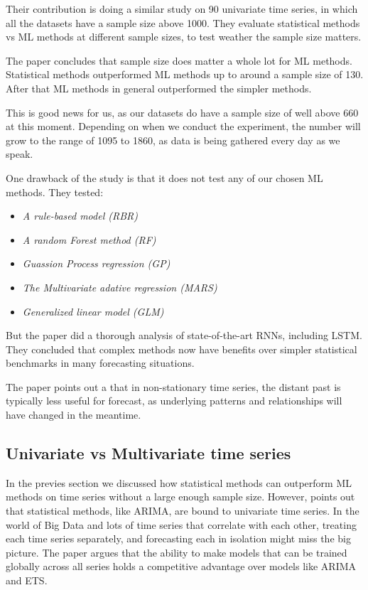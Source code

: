 Their contribution is doing a similar study on 90 univariate time series, in which 
all the datasets have a sample size above 1000. They evaluate statistical methods vs ML methods
at different sample sizes, to test weather the sample size matters.

The paper \cite{Cerqueira2019} concludes that sample size does matter a whole lot for ML methods.
Statistical methods outperformed ML methods up to around a sample size of 130. After that ML methods
in general outperformed the simpler methods.

This is good news for us, as our datasets do have a sample size of well above 660 at this moment.
Depending on when we conduct the experiment, the number will grow to the range of 1095 to 1860,
as data is being gathered every day as we speak.

One drawback of the \cite{Makridakis2018} study is that it does not test any of our chosen ML methods.
They tested:
\begin{itemize}
  \item \textit{A rule-based model (RBR)}
  \item \textit{A random Forest method (RF)}
  \item \textit{Guassion Process regression (GP)}
  \item \textit{The Multivariate adative regression (MARS)}
  \item \textit{Generalized linear model (GLM)}
\end{itemize}
But the paper \cite{Hewamalage2021} did a thorough analysis of state-of-the-art RNNs, including LSTM.
They concluded that complex methods now have benefits over simpler statistical benchmarks in many forecasting situations.


The paper \citet{Bandara2017} points out a that in non-stationary time series, the distant past is typically less
useful for forecast, as underlying patterns and relationships will have changed in the meantime.


\subsection{Univariate vs Multivariate time series}
In the previes section we discussed how statistical methods can outperform ML methods on
time series without a large enough sample size.
However, \cite{Bandara2017} points out that statistical methods, like ARIMA, are bound to
univariate time series. In the world of Big Data and lots of time series that correlate with each other,
treating each time series separately, and forecasting each in isolation might miss the big picture.
The paper argues that the ability to make models that can be trained globally across all series
holds a competitive advantage over models like ARIMA and ETS.

